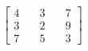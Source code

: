 \documentclass[preview]{standalone}
\begin{document}
\begin{align*}
\begin{bmatrix} 4 & \quad 3 & \quad 7 \\ 3 & \quad 2 & \quad 9 \\ 7 & \quad 5 & \quad 3 \end{bmatrix}
\end{align*}
\end{document}
